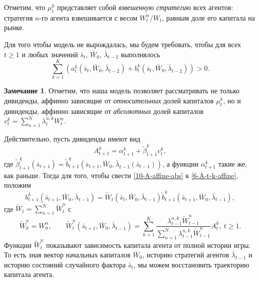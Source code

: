\documentclass[a4paper,12pt,russian]{article} %
\theoremstyle{definition}
\newtheorem{remark}{Замечание}
\renewcommand{\tilde}{\widetilde}
\begin{document}
Отметим, что $\mu_{t}^k$ представляет собой \emph{взвешенную стратегию} всех агентов: стратегия $n$-го агента взвешивается с весом $W_t^n/W_t$, равным доле его капитала на рынке.

Для того чтобы модель не вырождалась, мы будем требовать, чтобы для всех $t\ge 1$ и любых значений $\bar s_{t}$, $\bar W_0$, $ \bar \lambda_{t-2}$ выполнялось
\begin{equation}
\label{9-a-b-assumption}
\sum_{k=1}^K (a_{t}^k(\bar s_{t}, \bar W_0, \bar\lambda_{t-2}) + b_{t}^k (\bar s_{t}, \bar W_0, \bar\lambda_{t-2})) > 0.
\end{equation}

\begin{remark}
\label{remark-abs-wealth}
Отметим, что наша модель позволяет рассматривать не только дивиденды, 
аффинно зависящие от \emph{относительных} долей капиталов $\mu_t^k$, но и дивиденды, аффинно зависящие от \emph{абсолютных} долей капиталов $v_{t}^k = \sum_{n=1}^N \lambda_{t}^{n,k} W_t^n$. 

Действительно, пусть дивиденды имеют вид
\begin{equation}
\label{10-A-affine-abs}
A_{t+1}^k = \alpha_{t+1}^k + \tilde \beta_{t+1}^k v_{t}^k,
\end{equation}
где $\tilde \beta_{t+1}^k( \bar s_{t+1}) = \tilde b_{t+1}^k(\bar s_{t+1},\bar W_0, \bar\lambda_{t-1} ( \bar s_{t-1} ))$, а функции $\alpha_{t+1}^k$ такие же, как раньше. Тогда для того, чтобы свести \eqref{10-A-affine-abs} к \eqref{6-A-t-k-affine}, положим
\[
b_{t+1}^k( \bar s_{t+1},\bar W_0, \bar\lambda_{t-1} ) 
= \tilde W_t( \bar s_{t},\bar W_0, \bar\lambda_{t-1} ) 
  \tilde b_{t+1}^k( \bar s_{t+1},\bar W_0, \bar\lambda_{t-1} ), 
\]
где $\tilde W_t = \sum_{n=1}^N \tilde W_t^n$ с 
\[
\tilde W_0^n = W_0^n, \qquad
\tilde W_t^n( \bar s_{t+1},\bar W_0, \bar\lambda_{t-1} ) 
  = \sum_{k=1}^K
    \frac{\lambda_{t-1}^{n,k} \tilde W_{t-1}^n}
         {\sum_{n=1}^N \lambda_{t-1}^{n,k} \tilde W_{t-1}^n} A_{t}^k,\ t\ge 1.
\]
Функции  $\tilde W_t^n$ показывают зависимость капитала агента от полной истории игры. То есть зная вектор начальных капиталов $\bar W_0$, историю стратегий агентов $\bar\lambda_{t-1}$ и историю состояний случайного фактора $\bar s_{t}$, мы можем восстановить траекторию капитала агента.
\end{remark}









\end{document}
